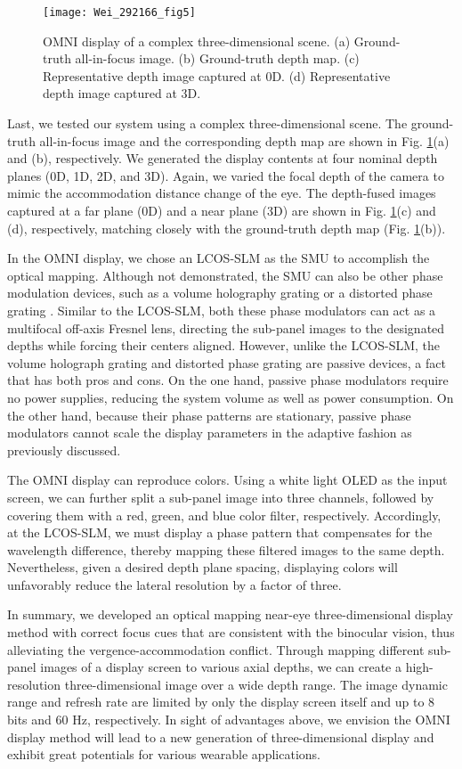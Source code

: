 \documentclass[9pt,twocolumn,twoside]{osajnl}
\begin{document}
\begin{figure}[htbp]
	\centering
	\texttt{[image: Wei\_292166\_fig5]}
	\caption{OMNI display of a complex three-dimensional scene. (a) Ground-truth all-in-focus image. (b) Ground-truth depth map. (c) Representative depth image captured at 0D. (d) Representative depth image captured at 3D.}
	\label{fig:5}
\end{figure}
Last, we tested our system using a complex three-dimensional scene. The ground-truth all-in-focus image and the corresponding depth map are shown in Fig. \ref{fig:5}(a) and (b), respectively. We generated the display contents at four nominal depth planes (0D, 1D, 2D, and 3D). Again, we varied the focal depth of the camera to mimic the accommodation distance change of the eye. The depth-fused images captured at a far plane (0D) and a near plane (3D) are shown in Fig. \ref{fig:5}(c) and (d), respectively, matching closely with the ground-truth depth map (Fig. \ref{fig:5}(b)).\par
In the OMNI display, we chose an LCOS-SLM as the SMU to accomplish the optical mapping. Although not demonstrated, the SMU can also be other phase modulation devices, such as a volume holography grating \cite{sinha2004imaging,luo2010simulations} or a distorted phase grating \cite{dalgarno2010multiplane,blanchard1999simultaneous}. Similar to the LCOS-SLM, both these phase modulators can act as a multifocal off-axis Fresnel lens, directing the sub-panel images to the designated depths while forcing their centers aligned. However, unlike the LCOS-SLM, the volume holograph grating and distorted phase grating are passive devices, a fact that has both pros and cons. On the one hand, passive phase modulators require no power supplies, reducing the system volume as well as power consumption. On the other hand, because their phase patterns are stationary, passive phase modulators cannot scale the display parameters in the adaptive fashion as previously discussed.\par
The OMNI display can reproduce colors. Using a white light OLED as the input screen, we can further split a sub-panel image into three channels, followed by covering them with a red, green, and blue color filter, respectively. Accordingly, at the LCOS-SLM, we must display a phase pattern that compensates for the wavelength difference, thereby mapping these filtered images to the same depth. Nevertheless, given a desired depth plane spacing, displaying colors will unfavorably reduce the lateral resolution by a factor of three.\par
In summary, we developed an optical mapping near-eye three-dimensional display method with correct focus cues that are consistent with the binocular vision, thus alleviating the vergence-accommodation conflict. Through mapping different sub-panel images of a display screen to various axial depths, we can create a high-resolution three-dimensional image over a wide depth range. The image dynamic range and refresh rate are limited by only the display screen itself and up to 8 bits and 60 Hz, respectively. In sight of advantages above, we envision the OMNI display method will lead to a new generation of three-dimensional display and exhibit great potentials for various wearable applications.\\
\end{document}
